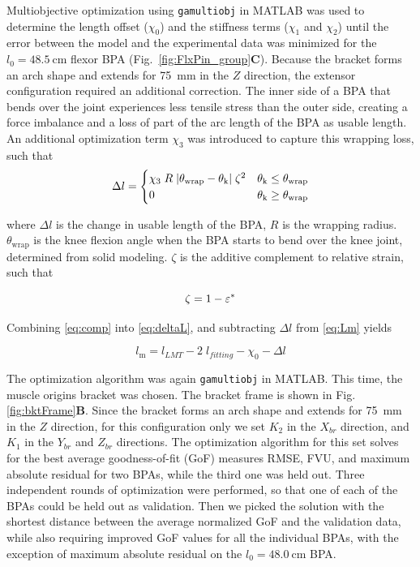 Multiobjective optimization using \texttt{gamultiobj} in MATLAB was used to determine the length offset ($\chi_{0}$) and the stiffness terms ($\chi_{1}$ and $\chi_{2}$) until the error between the model and the experimental data was minimized for the $l_{0}=\qty{48.5}{\cm}$ flexor BPA (Fig.~\ref{fig:FlxPin_group}\textbf{C}). Because the bracket forms an arch shape and extends for \qty{75}{\mm} in the $Z$ direction, the extensor configuration required an additional correction. The inner side of a BPA that bends over the joint experiences less tensile stress than the outer side, creating a force imbalance and a loss of part of the arc length of the BPA as usable length. An additional optimization term $\chi_{3}$ was introduced to capture this wrapping loss, such that
\begin{equation}
    \Delta l = \begin{cases}
     \chi_{3}\;R\;\lvert \theta_\text{wrap}-\theta_\text{k}\rvert\;\zeta^2 & \theta_\text{k} \leq      \theta_\text{wrap} \\
      0 & \theta_\text{k} \geq \theta_\text{wrap}
     \end{cases}\label{eq:deltaL}
\end{equation}

where $\Delta l$ is the change in usable length of the BPA, $R$ is the wrapping radius. $\theta_\text{wrap}$ is the knee flexion angle when the BPA starts to bend over the knee joint, determined from solid modeling. $\zeta$ is the additive complement to relative strain, such that

\begin{equation}
    \zeta = 1-\varepsilon^*  \\
\label{eq:comp}
\end{equation}

Combining \eqref{eq:comp} into \eqref{eq:deltaL}, and subtracting $\Delta l$ from  \eqref{eq:Lm} yields

\begin{equation}
    l_\text{m} = l_{LMT} - 2\;l_{fitting}  - \chi_{0} - \Delta l\label{eq:x3}
\end{equation}

The optimization algorithm was again \texttt{gamultiobj} in MATLAB. This time, the muscle origins bracket was chosen. The bracket frame is shown in Fig. \ref{fig:bktFrame}\textbf{B}. Since the bracket forms an arch shape and extends for \qty{75}{\mm} in the $Z$ direction, for this configuration only we set $K_{2}$ in the $X_{br}$ direction, and $K_{1}$ in the $Y_{br}$ and $Z_{br}$ directions. The optimization algorithm for this set solves for the best average goodness-of-fit (GoF) measures RMSE, FVU, and maximum absolute residual for two BPAs, while the third one was held out. Three independent rounds of optimization were performed, so that one of each of the BPAs could be held out as validation. Then we picked the solution with the shortest distance between the average normalized GoF and the validation data, while also requiring improved GoF values for all the individual BPAs, with the exception of maximum absolute residual on the $l_{0}=\qty{48.0}{\cm}$ BPA.


